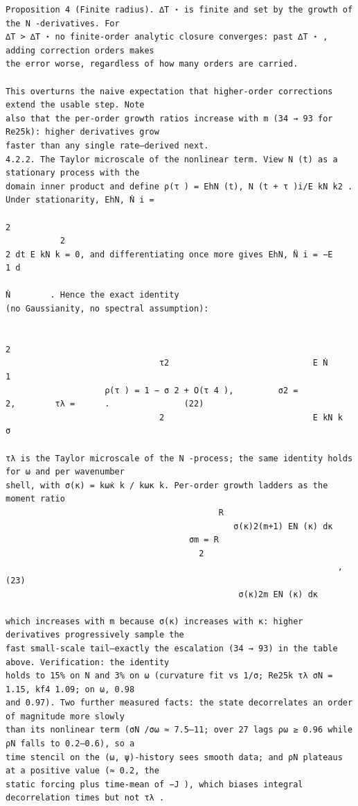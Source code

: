 \documentclass[letterpaper]{article}
\begin{document}
\begin{Verbatim}[fontsize=\fontsize{6.35}{7.15}\selectfont,breaklines=false]
Proposition 4 (Finite radius). ∆T ⋆ is finite and set by the growth of the N -derivatives. For
∆T > ∆T ⋆ no finite-order analytic closure converges: past ∆T ⋆ , adding correction orders makes
the error worse, regardless of how many orders are carried.

This overturns the naive expectation that higher-order corrections extend the usable step. Note
also that the per-order growth ratios increase with m (34 → 93 for Re25k): higher derivatives grow
faster than any single rate—derived next.
4.2.2. The Taylor microscale of the nonlinear term. View N (t) as a stationary process with the
domain inner product and define ρ(τ ) = EhN (t), N (t + τ )i/E kN k2 . Under stationarity, EhN, Ṅ i =
                                                                                  2
           2
2 dt E kN k = 0, and differentiating once more gives EhN, N̈ i = −E
1 d
                                                                            Ṅ        . Hence the exact identity
(no Gaussianity, no spectral assumption):

                                                                       2
                               τ2                             E Ṅ                       1
                    ρ(τ ) = 1 − σ 2 + O(τ 4 ),         σ2 =            2,        τλ =      .               (22)
                               2                              E kN k                     σ

τλ is the Taylor microscale of the N -process; the same identity holds for ω and per wavenumber
shell, with σ(κ) = kω̇κ k / kωκ k. Per-order growth ladders as the moment ratio
                                           R
                                              σ(κ)2(m+1) EN (κ) dκ
                                     σm = R
                                       2
                                                                   ,                        (23)
                                               σ(κ)2m EN (κ) dκ

which increases with m because σ(κ) increases with κ: higher derivatives progressively sample the
fast small-scale tail—exactly the escalation (34 → 93) in the table above. Verification: the identity
holds to 15% on N and 3% on ω (curvature fit vs 1/σ; Re25k τλ σN = 1.15, kf4 1.09; on ω, 0.98
and 0.97). Two further measured facts: the state decorrelates an order of magnitude more slowly
than its nonlinear term (σN /σω ≈ 7.5–11; over 27 lags ρω ≥ 0.96 while ρN falls to 0.2–0.6), so a
time stencil on the (ω, ψ)-history sees smooth data; and ρN plateaus at a positive value (≈ 0.2, the
static forcing plus time-mean of −J ), which biases integral decorrelation times but not τλ .





\end{Verbatim}
\end{document}
